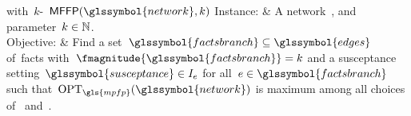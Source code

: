 \begin{problem}[framed]{\MFFP with~$k$-\facts~$\mffp(\glssymbol{network},k)$}%
    Instance:  & A network~, and parameter~$k\in\mathbb{N}$.\\
    Objective: & Find a set~$\glssymbol{factsbranch}\subseteq\glssymbol{edges}$
    of~\gls{facts} with~$\fmagnitude{\glssymbol{factsbranch}} = k$ and a
    susceptance setting~$\glssymbol{susceptance}\in\interval_{\edge}$ for
    all~$\edge\in\glssymbol{factsbranch}$ such
    that~$\opt_{\gls{mpfp}}(\glssymbol{network})$ is maximum among all choices
    of~ and~.
    \label{problems:facts:MFF:N-k}
\end{problem}%